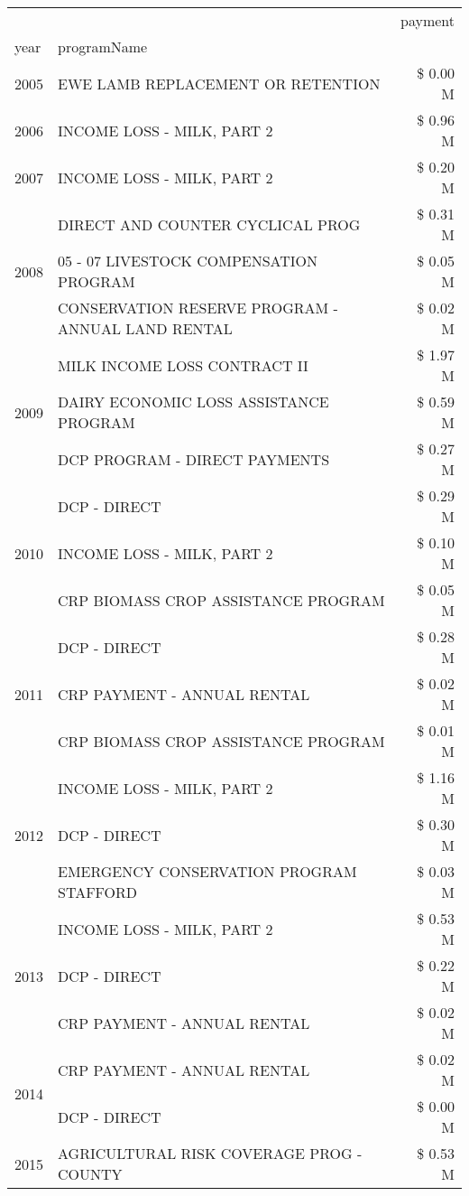 \begin{tabular}{llr}
\toprule
 &  & payment \\
year & programName &  \\
\midrule
2005 & EWE LAMB REPLACEMENT OR RETENTION & \$ 0.00 M \\
\cline{1-3}
2006 & INCOME LOSS - MILK, PART 2 & \$ 0.96 M \\
\cline{1-3}
2007 & INCOME LOSS - MILK, PART 2 & \$ 0.20 M \\
\cline{1-3}
\multirow[t]{3}{*}{2008} & DIRECT AND COUNTER CYCLICAL PROG & \$ 0.31 M \\
 & 05 - 07 LIVESTOCK COMPENSATION PROGRAM & \$ 0.05 M \\
 & CONSERVATION RESERVE PROGRAM - ANNUAL LAND RENTAL & \$ 0.02 M \\
\cline{1-3}
\multirow[t]{3}{*}{2009} & MILK INCOME LOSS CONTRACT II & \$ 1.97 M \\
 & DAIRY ECONOMIC LOSS ASSISTANCE PROGRAM & \$ 0.59 M \\
 & DCP PROGRAM - DIRECT PAYMENTS & \$ 0.27 M \\
\cline{1-3}
\multirow[t]{3}{*}{2010} & DCP - DIRECT & \$ 0.29 M \\
 & INCOME LOSS - MILK, PART 2 & \$ 0.10 M \\
 & CRP BIOMASS CROP ASSISTANCE PROGRAM & \$ 0.05 M \\
\cline{1-3}
\multirow[t]{3}{*}{2011} & DCP - DIRECT & \$ 0.28 M \\
 & CRP PAYMENT - ANNUAL RENTAL & \$ 0.02 M \\
 & CRP BIOMASS CROP ASSISTANCE PROGRAM & \$ 0.01 M \\
\cline{1-3}
\multirow[t]{3}{*}{2012} & INCOME LOSS - MILK, PART 2 & \$ 1.16 M \\
 & DCP - DIRECT & \$ 0.30 M \\
 & EMERGENCY CONSERVATION PROGRAM STAFFORD & \$ 0.03 M \\
\cline{1-3}
\multirow[t]{3}{*}{2013} & INCOME LOSS - MILK, PART 2 & \$ 0.53 M \\
 & DCP - DIRECT & \$ 0.22 M \\
 & CRP PAYMENT - ANNUAL RENTAL & \$ 0.02 M \\
\cline{1-3}
\multirow[t]{2}{*}{2014} & CRP PAYMENT - ANNUAL RENTAL & \$ 0.02 M \\
 & DCP - DIRECT & \$ 0.00 M \\
\cline{1-3}
\multirow[t]{3}{*}{2015} & AGRICULTURAL RISK COVERAGE PROG - COUNTY & \$ 0.53 M \\

\end{tabular}
